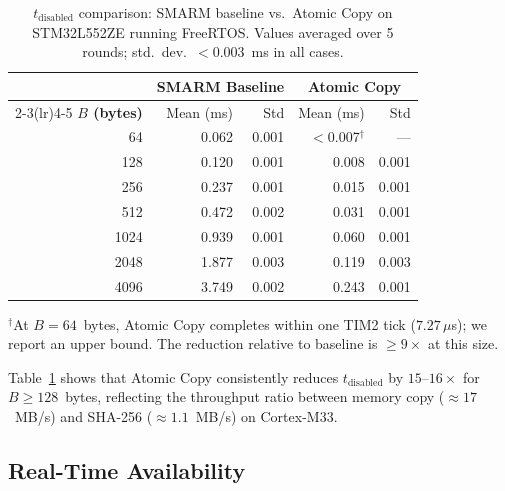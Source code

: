 \documentclass[conference]{IEEEtran}
\newcommand{\tdis}{$t_{\mathrm{disabled}}$\xspace}
\begin{document}
\begin{table}[!ht]
  \centering
  \small
  \caption{$t_{\mathrm{disabled}}$ comparison: SMARM baseline vs.\
    Atomic Copy on STM32L552ZE running FreeRTOS. Values averaged
    over 5 rounds; std.\ dev.\ $< 0.003$~ms in all cases.}
  \label{tab:tdisabled}
  \setlength{\tabcolsep}{4pt}
  \begin{tabular}{rrrrr}
    \toprule
    & \multicolumn{2}{c}{\textbf{SMARM Baseline}} 
    & \multicolumn{2}{c}{\textbf{Atomic Copy}} \\
    \cmidrule(lr){2-3}\cmidrule(lr){4-5}
    \textbf{$B$ (bytes)} & Mean (ms) & Std & Mean (ms) & Std \\
    \midrule
    64   & 0.062 & 0.001 & $<$0.007$^\dagger$ & --- \\
    128  & 0.120 & 0.001 & 0.008 & 0.001 \\
    256  & 0.237 & 0.001 & 0.015 & 0.001 \\
    512  & 0.472 & 0.002 & 0.031 & 0.001 \\
    1024 & 0.939 & 0.001 & 0.060 & 0.001 \\
    2048 & 1.877 & 0.003 & 0.119 & 0.003 \\
    4096 & 3.749 & 0.002 & 0.243 & 0.001 \\
    \bottomrule
  \end{tabular}

  \smallskip
  \raggedright\footnotesize
  $^\dagger$At $B = 64$~bytes, Atomic Copy completes within one TIM2
  tick ($7.27\,\mu$s); we report an upper bound.
  The reduction relative to baseline is $\geq 9\times$ at this size.
\end{table}

Table~\ref{tab:tdisabled} shows that Atomic Copy consistently reduces
\tdis by $15$--$16\times$ for $B \geq 128$~bytes, reflecting the
throughput ratio between memory copy ($\approx 17$~MB/s) and
SHA-256 ($\approx 1.1$~MB/s) on Cortex-M33.






\subsection{Real-Time Availability}
\end{document}
